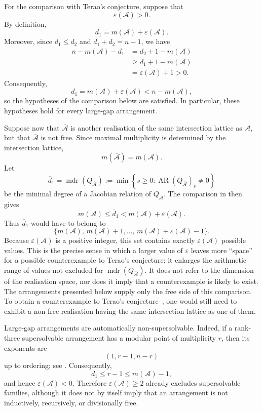 \documentclass[pdflatex,sn-mathphys-num]{sn-jnl}%
\renewcommand{\epsilon}{\varepsilon}
\theoremstyle{remark}
\theoremstyle{definition}
\begin{document}
For the comparison with Terao's conjecture, suppose that
\[
\epsilon(\mathcal{A})>0.
\]
By definition,
\[
d_1=m(\mathcal{A})+\epsilon(\mathcal{A}).
\]
Moreover, since $d_1\leq d_2$ and $d_1+d_2=n-1$, we have
\begin{align*}
n-m(\mathcal{A})-d_1
&=
d_2+1-m(\mathcal{A})\\
&\geq
d_1+1-m(\mathcal{A})\\
&=
\epsilon(\mathcal{A})+1
>0.
\end{align*}
Consequently,
\[
d_1
=
m(\mathcal{A})+\epsilon(\mathcal{A})
<
n-m(\mathcal{A}),
\]
so the hypotheses of the comparison below are satisfied. In particular,
these hypotheses hold for every large-gap arrangement.

Suppose now that $\overline{\mathcal{A}}$ is another realisation of the same
intersection lattice as $\mathcal{A}$, but that $\overline{\mathcal{A}}$ is not
free. Since maximal multiplicity is determined by the intersection lattice,
\[
m(\overline{\mathcal{A}})=m(\mathcal{A}).
\]
Let
\[
\overline d_1
=
\operatorname{mdr}(Q_{\overline{\mathcal{A}}})
:=
\min\left\{
s\geq0:
\operatorname{AR}(Q_{\overline{\mathcal{A}}})_s\neq0
\right\}
\]
be the minimal degree of a Jacobian relation of
$Q_{\overline{\mathcal{A}}}$. The comparison in
\cite{Dimca2026freelinearrangementslow} then gives
\begin{equation}
\label{eq:terao-gap-window}
m(\mathcal{A})
\leq
\overline d_1
<
m(\mathcal{A})+\epsilon(\mathcal{A}).
\end{equation}
Thus $\overline d_1$ would have to belong to
\[
\bigl\{
m(\mathcal{A}),\,
m(\mathcal{A})+1,\ldots,\,
m(\mathcal{A})+\epsilon(\mathcal{A})-1
\bigr\}.
\]
Because $\epsilon(\mathcal{A})$ is a positive integer, this set contains
exactly $\epsilon(\mathcal{A})$ possible values. This is the precise sense in
which a larger value of $\epsilon$ leaves more ``space'' for a possible
counterexample to Terao's conjecture: it enlarges the arithmetic range of
values not excluded for
$\operatorname{mdr}(Q_{\overline{\mathcal{A}}})$. It does not refer to the
dimension of the realisation space, nor does it imply that a counterexample
is likely to exist. The arrangements presented below supply only the free
side of this comparison. To obtain a counterexample to Terao's
conjecture~\cite{Terao80}, one would still need to exhibit a non-free
realisation having the same intersection lattice as one of them.

Large-gap arrangements are automatically non-supersolvable. Indeed, if a rank-three supersolvable arrangement has a modular point of multiplicity $r$, then its exponents are
\[
(1,r-1,n-r)
\]
up to ordering; see \cite[Theorem~4.58]{Orlik1992}. Consequently,
\[
d_1\leq r-1\leq m(\mathcal{A})-1,
\]
and hence $\epsilon(\mathcal{A})<0$. Therefore $\epsilon(\mathcal{A})\geq2$ already excludes supersolvable families, although it does not by itself imply that an arrangement is not inductively, recursively, or divisionally free.
\end{document}
